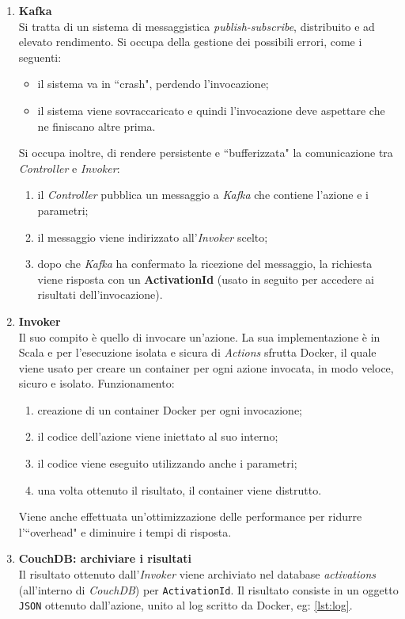 \documentclass[12pt,a4paper,openany,twoside]{book}
\begin{document}
\begin{enumerate}
    \item \textbf{Kafka} \\
    Si tratta di un sistema di messaggistica \textit{publish-subscribe}, distribuito e ad elevato rendimento.
    Si occupa della gestione dei possibili errori, come i seguenti:
    \begin{itemize}
        \item il sistema va in ``crash", perdendo l'invocazione;
        \item il sistema viene sovraccaricato e quindi l'invocazione deve aspettare che ne finiscano altre prima.
    \end{itemize}
    Si occupa inoltre, di rendere persistente e ``bufferizzata" la comunicazione tra \textit{Controller} e \textit{Invoker}:
    \begin{enumerate}
        \item il \textit{Controller} pubblica un messaggio a \textit{Kafka} che contiene l'azione e i parametri;
        \item il messaggio viene indirizzato all'\textit{Invoker} scelto;
        \item dopo che \textit{Kafka} ha confermato la ricezione del messaggio, la richiesta viene risposta con un \textbf{ActivationId} (usato in seguito per accedere ai risultati dell'invocazione).
    \end{enumerate}
    
    \item \textbf{Invoker} \\
    Il suo compito è quello di invocare un'azione. La sua implementazione è in Scala e per l'esecuzione isolata e sicura di \textit{Actions} sfrutta Docker, il quale viene usato per creare un container per ogni azione invocata, in modo veloce, sicuro e isolato.
    Funzionamento:
    \begin{enumerate}
        \item creazione di un container Docker per ogni invocazione;
        \item il codice dell'azione viene iniettato al suo interno;
        \item il codice viene eseguito utilizzando anche i parametri;
        \item una volta ottenuto il risultato, il container viene distrutto.
    \end{enumerate}
    Viene anche effettuata un'ottimizzazione delle performance per ridurre l'``overhead" e diminuire i tempi di risposta.
    
    \item \textbf{CouchDB: archiviare i risultati} \\
    Il risultato ottenuto dall'\textit{Invoker} viene archiviato nel database \textit{activations} (all'interno di \textit{CouchDB}) per \texttt{ActivationId}.
    Il risultato consiste in un oggetto \texttt{JSON} ottenuto dall'azione, unito al log scritto da Docker, eg: \cref{lst:log}.


\end{enumerate}
\end{document}
